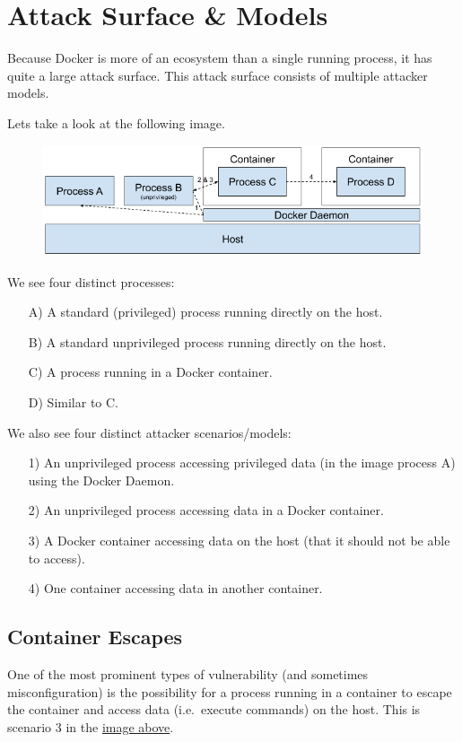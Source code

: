 \section{Attack Surface \& Models}

Because Docker is more of an ecosystem than a single running process, it has quite a large attack surface. This attack surface consists of multiple attacker models.

\hfill

Lets take a look at the following image.

\begin{figure}[ht]
    \centering
    \includegraphics[width=.8\linewidth]{resources/images/attacksurfaces.png}
    \label{fig:attacksurfaces}
\end{figure}

We see four distinct processes:
\begin{enumerate}
    \item[A)] A standard (privileged) process running directly on the host.
    \item[B)] A standard unprivileged process running directly on the host.
    \item[C)] A process running in a Docker container.
    \item[D)] Similar to C.
\end{enumerate}

\hfill

We also see four distinct attacker scenarios/models:
\begin{enumerate}
    \item[1)] An unprivileged process accessing privileged data (in the image process A) using the Docker Daemon.
    \item[2)] An unprivileged process accessing data in a Docker container.
    \item[3)] A Docker container accessing data on the host (that it should not be able to access).
    \item[4)] One container accessing data in another container.
\end{enumerate}

\subsection{Container Escapes}
One of the most prominent types of vulnerability (and sometimes misconfiguration) is the possibility for a process running in a container to escape the container and access data (i.e.\ execute commands) on the host. This is scenario 3 in the \href{fig:attacksurfaces}{image above}.


